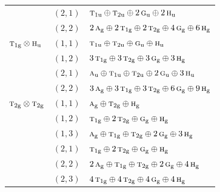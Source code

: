 \documentclass[11pt]{article}
\newcommand{\irr}[1]{\text{\normalfont\scshape #1}}
\newcommand{\ptag}[1]{\mathrm{#1}}
\begin{document}
\begin{longtable}{p{} c p{}}
 & $(2,1)$ & $\irr{t}_{1\ptag{u}}\oplus \irr{t}_{2\ptag{u}}\oplus 2\,\irr{g}_{\ptag{u}}\oplus 2\,\irr{h}_{\ptag{u}}$\\

 & $(2,2)$ & $2\,\irr{a}_{\ptag{g}}\oplus 2\,\irr{t}_{1\ptag{g}}\oplus 2\,\irr{t}_{2\ptag{g}}\oplus 4\,\irr{g}_{\ptag{g}}\oplus 6\,\irr{h}_{\ptag{g}}$\\

\hline

$\irr{t}_{1\ptag{g}}\otimes \irr{h}_{\ptag{u}}$ & $(1,1)$ & $\irr{t}_{1\ptag{u}}\oplus \irr{t}_{2\ptag{u}}\oplus \irr{g}_{\ptag{u}}\oplus \irr{h}_{\ptag{u}}$\\

 & $(1,2)$ & $3\,\irr{t}_{1\ptag{g}}\oplus 3\,\irr{t}_{2\ptag{g}}\oplus 3\,\irr{g}_{\ptag{g}}\oplus 3\,\irr{h}_{\ptag{g}}$\\

 & $(2,1)$ & $\irr{a}_{\ptag{u}}\oplus \irr{t}_{1\ptag{u}}\oplus \irr{t}_{2\ptag{u}}\oplus 2\,\irr{g}_{\ptag{u}}\oplus 3\,\irr{h}_{\ptag{u}}$\\

 & $(2,2)$ & $3\,\irr{a}_{\ptag{g}}\oplus 3\,\irr{t}_{1\ptag{g}}\oplus 3\,\irr{t}_{2\ptag{g}}\oplus 6\,\irr{g}_{\ptag{g}}\oplus 9\,\irr{h}_{\ptag{g}}$\\

\hline

$\irr{t}_{2\ptag{g}}\otimes \irr{t}_{2\ptag{g}}$ & $(1,1)$ & $\irr{a}_{\ptag{g}}\oplus \irr{t}_{2\ptag{g}}\oplus \irr{h}_{\ptag{g}}$\\

 & $(1,2)$ & $\irr{t}_{1\ptag{g}}\oplus 2\,\irr{t}_{2\ptag{g}}\oplus \irr{g}_{\ptag{g}}\oplus \irr{h}_{\ptag{g}}$\\

 & $(1,3)$ & $\irr{a}_{\ptag{g}}\oplus \irr{t}_{1\ptag{g}}\oplus \irr{t}_{2\ptag{g}}\oplus 2\,\irr{g}_{\ptag{g}}\oplus 3\,\irr{h}_{\ptag{g}}$\\

 & $(2,1)$ & $\irr{t}_{1\ptag{g}}\oplus 2\,\irr{t}_{2\ptag{g}}\oplus \irr{g}_{\ptag{g}}\oplus \irr{h}_{\ptag{g}}$\\

 & $(2,2)$ & $2\,\irr{a}_{\ptag{g}}\oplus \irr{t}_{1\ptag{g}}\oplus \irr{t}_{2\ptag{g}}\oplus 2\,\irr{g}_{\ptag{g}}\oplus 4\,\irr{h}_{\ptag{g}}$\\

 & $(2,3)$ & $4\,\irr{t}_{1\ptag{g}}\oplus 4\,\irr{t}_{2\ptag{g}}\oplus 4\,\irr{g}_{\ptag{g}}\oplus 4\,\irr{h}_{\ptag{g}}$\\


\end{longtable}
\end{document}

